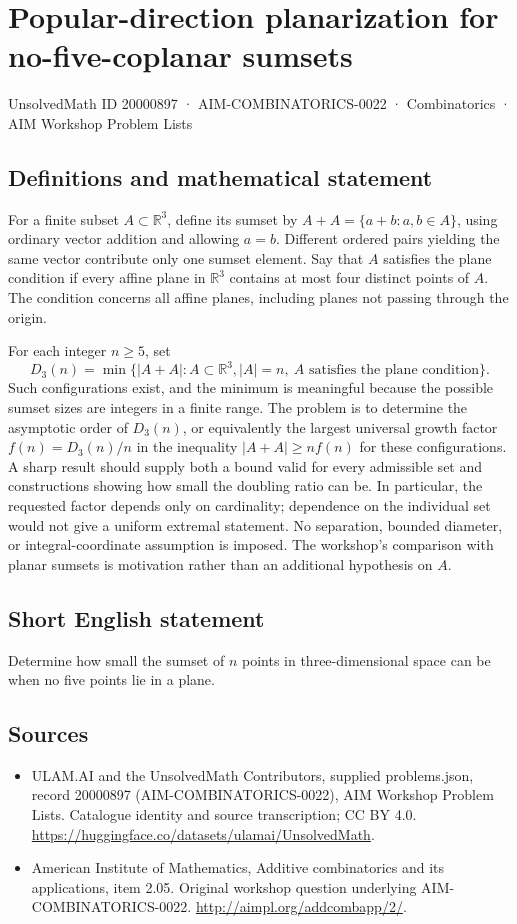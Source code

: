 \documentclass[11pt,a4paper]{article}
\begin{document}
\section*{Popular-direction planarization for no-five-coplanar sumsets}\label{20000897}
{\small UnsolvedMath ID 20000897 · AIM-COMBINATORICS-0022 · Combinatorics · AIM Workshop Problem Lists}
\subsection{Definitions and mathematical statement}
For a finite subset $A\subset\mathbb R^3$, define its sumset by
$A+A=\{a+b:a,b\in A\}$, using ordinary vector addition and allowing $a=b$.
Different ordered pairs yielding the same vector contribute only one sumset element.
Say that $A$ satisfies the plane condition if every affine plane in $\mathbb R^3$ contains at most four distinct points of $A$.
The condition concerns all affine planes, including planes not passing through the origin.

For each integer $n\geq5$, set
\[
 D_3(n)=\min\{|A+A|: A\subset\mathbb R^3,
       |A|=n,\ A\text{ satisfies the plane condition}\}.
\]
Such configurations exist, and the minimum is meaningful because the possible sumset sizes are integers in a finite range.
The problem is to determine the asymptotic order of $D_3(n)$, or equivalently the largest universal growth factor $f(n)=D_3(n)/n$ in the inequality $|A+A|\geq n f(n)$ for these configurations.
A sharp result should supply both a bound valid for every admissible set and constructions showing how small the doubling ratio can be.
In particular, the requested factor depends only on cardinality; dependence on the individual set would not give a uniform extremal statement.
No separation, bounded diameter, or integral-coordinate assumption is imposed.
The workshop's comparison with planar sumsets is motivation rather than an additional hypothesis on $A$.
\subsection{Short English statement}
Determine how small the sumset of $n$ points in three-dimensional space can be when no five points lie in a plane.
\subsection{Sources}
\begin{itemize}
\item[S1] ULAM.AI and the UnsolvedMath Contributors, supplied problems.json, record 20000897 (AIM-COMBINATORICS-0022), AIM Workshop Problem Lists. Catalogue identity and source transcription; CC BY 4.0.
\url{https://huggingface.co/datasets/ulamai/UnsolvedMath}.
\item[S2] American Institute of Mathematics, Additive combinatorics and its applications, item 2.05. Original workshop question underlying AIM-COMBINATORICS-0022.
\url{http://aimpl.org/addcombapp/2/}.
\end{itemize}
\end{document}
